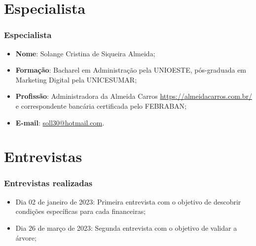 \documentclass[12pt]{beamer}
\begin{document}
\section{Especialista}
\begin{frame}
    \frametitle{Especialista}
    \begin{itemize}
        \item\textbf{Nome}: Solange Cristina de Siqueira Almeida;
        \item\textbf{Formação}: Bacharel em Administração pela UNIOESTE, pós-graduada em Marketing Digital pela UNICESUMAR\@;
        \item\textbf{Profissão}: Administradora da Almeida Carros \url{https://almeidacarros.com.br/} e correspondente bancária certificada pelo FEBRABAN\@;
        \item\textbf{E-mail}: \url{soll30@hotmail.com}.
    \end{itemize}
\end{frame}

\section{Entrevistas}
\begin{frame}
    \frametitle{Entrevistas realizadas}

    \begin{itemize}
        \item Dia 02 de janeiro de 2023: Primeira entrevista com o objetivo de descobrir condições específicas para cada financeiras;
        \item Dia 26 de março de 2023: Segunda entrevista com o objetivo de validar a árvore;
    \end{itemize}

\end{frame}
\end{document}

